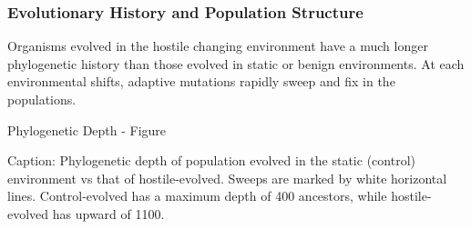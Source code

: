 \subsubsection{Evolutionary History and Population Structure}

Organisms evolved in the hostile changing environment have a much longer phylogenetic history than those evolved in static or benign environments. At each environmental shifts, adaptive mutations rapidly sweep and fix in the populations.

Phylogenetic Depth - Figure

Caption: Phylogenetic depth of population evolved in the static (control) environment vs that of hostile-evolved. Sweeps are marked by white horizontal lines. Control-evolved has a maximum depth of 400 ancestors, while hostile-evolved has upward of 1100.



